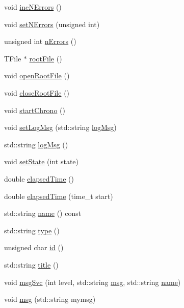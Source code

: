 \begin{DoxyCompactItemize}
\item 
void \hyperlink{classProcessus_abe603d0636f76db6aa6c5c60cf34c591}{inc\+N\+Errors} ()
\item 
void \hyperlink{classProcessus_a831b027b9cf18ab56fa6147b5d3055da}{set\+N\+Errors} (unsigned int)
\item 
unsigned int \hyperlink{classProcessus_a82a0487f82f07cc2c2dc2731f98149e7}{n\+Errors} ()
\item 
T\+File $\ast$ \hyperlink{classProcessus_a247e8c362ec08422cf53d08dd23b093c}{root\+File} ()
\item 
void \hyperlink{classProcessus_aacf6812880c1d1a2bf14a4a39458f443}{open\+Root\+File} ()
\item 
void \hyperlink{classProcessus_a2f3c41e99da4c738ea3d8f7b0d20a665}{close\+Root\+File} ()
\item 
void \hyperlink{classProcessus_a5e4d34b86241fa0756e07375a14ff4b2}{start\+Chrono} ()
\item 
void \hyperlink{classProcessus_a471833f89047aa9a7ff6200a31c17a1d}{set\+Log\+Msg} (std\+::string \hyperlink{classProcessus_a42fdeb17dc13ba854222666b6aa29b61}{log\+Msg})
\item 
std\+::string \hyperlink{classProcessus_a42fdeb17dc13ba854222666b6aa29b61}{log\+Msg} ()
\item 
void \hyperlink{classProcessus_ad38cde0f1bcefa00b068e7947b8af927}{set\+State} (int state)
\item 
double \hyperlink{classProcessus_aecca96218c65bc805c988cd95447df55}{elapsed\+Time} ()
\item 
double \hyperlink{classProcessus_a06d3815ad56593dfd0d3c1f534f8b146}{elapsed\+Time} (time\+\_\+t start)
\item 
std\+::string \hyperlink{classObject_a300f4c05dd468c7bb8b3c968868443c1}{name} () const
\item 
std\+::string \hyperlink{classObject_a84f99f70f144a83e1582d1d0f84e4e62}{type} ()
\item 
unsigned char \hyperlink{classObject_af99145335cc61ff6e2798ea17db009d2}{id} ()
\item 
std\+::string \hyperlink{classObject_a73a0f1a41828fdd8303dd662446fb6c3}{title} ()
\item 
void \hyperlink{classObject_a3f9d5537ebce0c0f2bf6ae4d92426f3c}{msg\+Svc} (int level, std\+::string \hyperlink{classObject_a58b2d0618c2d08cf2383012611528d97}{msg}, std\+::string \hyperlink{classObject_a300f4c05dd468c7bb8b3c968868443c1}{name})
\item 
void \hyperlink{classObject_a58b2d0618c2d08cf2383012611528d97}{msg} (std\+::string mymsg)

\end{DoxyCompactItemize}
